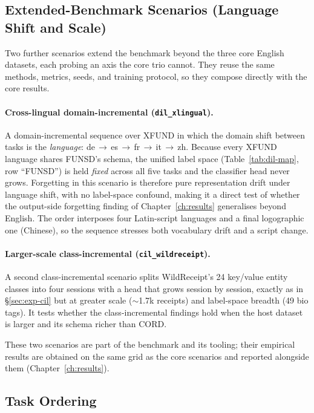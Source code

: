 \subsection{Extended-Benchmark Scenarios (Language Shift and Scale)}
\label{sec:exp-extended}

Two further scenarios extend the benchmark beyond the three core English datasets,
each probing an axis the core trio cannot. They reuse the same methods, metrics,
seeds, and training protocol, so they compose directly with the core results.

\paragraph{Cross-lingual domain-incremental (\texttt{dil\_xlingual}).} A
domain-incremental sequence over XFUND in which the domain shift between tasks is
the \emph{language}: de\,$\rightarrow$\,es\,$\rightarrow$\,fr\,$\rightarrow$\,it\,$\rightarrow$\,zh.
Because every XFUND language shares FUNSD's schema, the unified label space
(Table~\ref{tab:dil-map}, row ``FUNSD'') is held \emph{fixed} across all five tasks
and the classifier head never grows. Forgetting in this scenario is therefore pure
representation drift under language shift, with no label-space confound, making it a
direct test of whether the output-side forgetting finding of
Chapter~\ref{ch:results} generalises beyond English. The order interposes four
Latin-script languages and a final logographic one (Chinese), so the sequence
stresses both vocabulary drift and a script change.

\paragraph{Larger-scale class-incremental (\texttt{cil\_wildreceipt}).} A second
class-incremental scenario splits WildReceipt's 24 key/value entity classes into
four sessions with a head that grows session by session, exactly as in
\S\ref{sec:exp-cil} but at greater scale ($\sim$1.7k receipts) and label-space
breadth (49 \gls{bio} tags). It tests whether the class-incremental findings hold
when the host dataset is larger and its schema richer than CORD.

These two scenarios are part of the benchmark and its tooling; their empirical
results are obtained on the same grid as the core scenarios and reported alongside
them (Chapter~\ref{ch:results}).

\subsection{Task Ordering}
\label{sec:exp-ordering}


